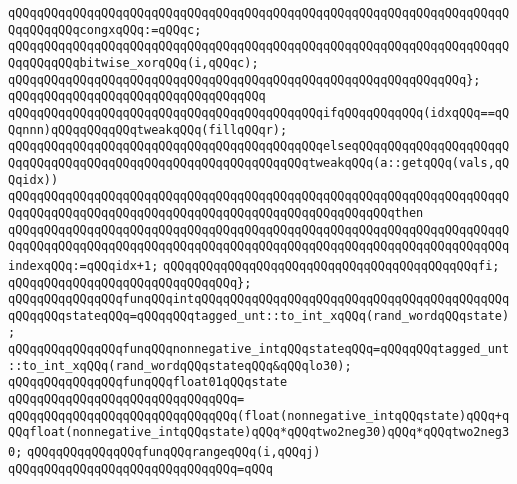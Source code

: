 \newline
\verb|qQQqqQQqqQQqqQQqqQQqqQQqqQQqqQQqqQQqqQQqqQQqqQQqqQQqqQQqqQQqqQQqqQQqqQQqqQQqqQQqcongxqQQq:=qQQqc;|\newline
\verb|qQQqqQQqqQQqqQQqqQQqqQQqqQQqqQQqqQQqqQQqqQQqqQQqqQQqqQQqqQQqqQQqqQQqqQQqqQQqqQQqbitwise_xorqQQq(i,qQQqc);|\newline
\verb|qQQqqQQqqQQqqQQqqQQqqQQqqQQqqQQqqQQqqQQqqQQqqQQqqQQqqQQqqQQqqQQq};|\newline
\verb|qQQqqQQqqQQqqQQqqQQqqQQqqQQqqQQqqQQq|\newline
\verb|qQQqqQQqqQQqqQQqqQQqqQQqqQQqqQQqqQQqqQQqqQQqifqQQqqQQqqQQq(idxqQQq==qQQqnnn)qQQqqQQqqQQqtweakqQQq(fillqQQqr);|\newline
\verb|qQQqqQQqqQQqqQQqqQQqqQQqqQQqqQQqqQQqqQQqqQQqelseqQQqqQQqqQQqqQQqqQQqqQQqqQQqqQQqqQQqqQQqqQQqqQQqqQQqqQQqqQQqqQQqtweakqQQq(a::getqQQq(vals,qQQqidx))|\newline
\verb|qQQqqQQqqQQqqQQqqQQqqQQqqQQqqQQqqQQqqQQqqQQqqQQqqQQqqQQqqQQqqQQqqQQqqQQqqQQqqQQqqQQqqQQqqQQqqQQqqQQqqQQqqQQqqQQqqQQqqQQqqQQqthen|\newline
\verb|qQQqqQQqqQQqqQQqqQQqqQQqqQQqqQQqqQQqqQQqqQQqqQQqqQQqqQQqqQQqqQQqqQQqqQQqqQQqqQQqqQQqqQQqqQQqqQQqqQQqqQQqqQQqqQQqqQQqqQQqqQQqqQQqqQQqqQQqqQQqindexqQQq:=qQQqidx+1;|\newline
\verb|qQQqqQQqqQQqqQQqqQQqqQQqqQQqqQQqqQQqqQQqqQQqfi;|\newline
\verb|qQQqqQQqqQQqqQQqqQQqqQQqqQQqqQQq};|\newline
\newline
\verb|qQQqqQQqqQQqqQQqfunqQQqintqQQqqQQqqQQqqQQqqQQqqQQqqQQqqQQqqQQqqQQqqQQqqQQqqQQqstateqQQq=qQQqqQQqtagged_unt::to_int_xqQQq(rand_wordqQQqstate);|\newline
\verb|qQQqqQQqqQQqqQQqfunqQQqnonnegative_intqQQqstateqQQq=qQQqqQQqtagged_unt::to_int_xqQQq(rand_wordqQQqstateqQQq&qQQqlo30);|\newline
\newline
\verb|qQQqqQQqqQQqqQQqfunqQQqfloat01qQQqstate|\newline
\verb|qQQqqQQqqQQqqQQqqQQqqQQqqQQqqQQq=|\newline
\verb|qQQqqQQqqQQqqQQqqQQqqQQqqQQqqQQq(float(nonnegative_intqQQqstate)qQQq+qQQqfloat(nonnegative_intqQQqstate)qQQq*qQQqtwo2neg30)qQQq*qQQqtwo2neg30;|\newline
\newline
\verb|qQQqqQQqqQQqqQQqfunqQQqrangeqQQq(i,qQQqj)|\newline
\verb|qQQqqQQqqQQqqQQqqQQqqQQqqQQqqQQq=qQQq|\newline
